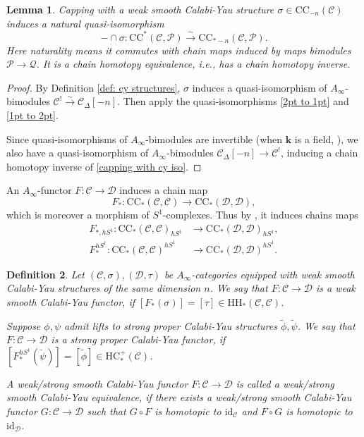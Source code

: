 \documentclass[11pt]{amsproc}
\def\K{{\mathbf{k}}}
\def\cP{\mathcal{P}}
\def\cQ{\mathcal{Q}}
\def\cc{\mathcal{C}}
\def\dd{\mathcal{D}}
\def\r#1{\mathrm{#1}}
\def\D{\Delta}
\def\ainf{A_\infty}
\def\id{\mathrm{id}}
\newtheorem{lem}{Lemma}[section]
\newtheorem{defn}[lem]{Definition}
\theoremstyle{remark}
\numberwithin{equation}{section}
\begin{document}
\begin{lem}\label{lem: capping with cy is iso}
Capping with a weak smooth Calabi-Yau structure $\sigma \in \r{CC}_{-n}(\cc)$ induces a natural quasi-isomorphism
\begin{equation}\label{capping with cy iso}
- \cap \sigma: \r{CC}^{*}(\cc, \cP) \stackrel{\sim}\to \r{CC}_{*-n}(\cc, \cP).
\end{equation}
Here naturality means it commutes with chain maps induced by maps bimodules $\cP \to \cQ$.
It is a chain homotopy equivalence, i.e., has a chain homotopy inverse.
\end{lem}
\begin{proof}
By Definition \ref{def: cy structures}, $\sigma$ induces a quasi-isomorphism of $\ainf$-bimodules $\cc^{!} \stackrel{\sim}\to \cc_{\D}[-n]$.
Then apply the quasi-isomorphisms \eqref{2pt to 1pt} and \eqref{1pt to 2pt}.

Since quasi-isomorphisms of $\ainf$-bimodules are invertible (when $\K$ is a field, \cite{seidel_book}),
we also have a quasi-isomorphism of $\ainf$-bimodules $\cc_{\D}[-n] \to \cc^{!}$, inducing a chain homotopy inverse of \eqref{capping with cy iso}.
\end{proof}

An $\ainf$-functor $F: \cc \to \dd$ induces a chain map
\begin{equation}
F_{*}: \r{CC}_{*}(\cc, \cc) \to \r{CC}_{*}(\dd, \dd),
\end{equation}
which is moreover a morphism of $S^{1}$-complexes.
Thus by \cite[Corollary 3]{ganatra_cyclic}, it induces chains maps
\begin{align}
F_{*, hS^{1}}: \r{CC}_{*}(\cc, \cc)_{hS^{1}} & \to \r{CC}_{*}(\dd, \dd)_{hS^{1}}, \\
F_{*}^{hS^{1}}: \r{CC}_{*}(\cc, \cc)^{hS^{1}} & \to \r{CC}_{*}(\dd, \dd)^{hS^{1}}.
\end{align}

\begin{defn}\label{def: weak smooth cy functor}
Let $(\cc, \sigma), (\dd, \tau)$ be $\ainf$-categories equipped with weak smooth Calabi-Yau structures of the same dimension $n$.
We say that $F: \cc \to \dd$ is a weak smooth Calabi-Yau functor, 
if $[F_{*}(\sigma)] = [\tau] \in \r{HH}_{*}(\cc, \cc)$.

Suppose $\phi, \psi$ admit lifts to strong proper Calabi-Yau structures $\tilde{\phi}, \tilde{\psi}$. 
We say that $F: \cc \to \dd$ is a strong proper Calabi-Yau functor,
if $[F_{*}^{hS^{1}}(\tilde{\psi})] = [\tilde{\phi}] \in \r{HC}_{*}^{+}(\cc)$.

A weak/strong smooth Calabi-Yau functor $F: \cc \to \dd$ is called a weak/strong smooth Calabi-Yau equivalence,
if there exists a weak/strong smooth Calabi-Yau functor $G: \cc \to \dd$ such that $G \circ F$ is homotopic to $\id_{\cc}$ and $F \circ G$ is homotopic to $\id_{\dd}$.
\end{defn}
\end{document}
